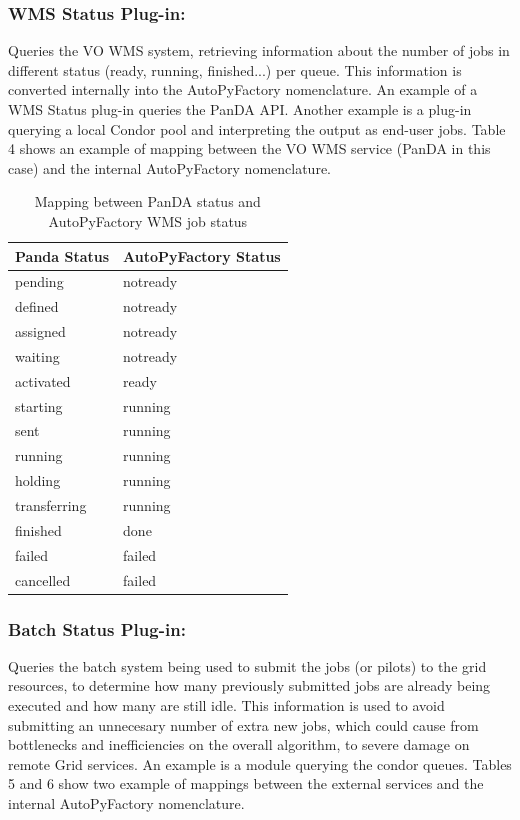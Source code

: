 \documentclass[a4paper]{jpconf}
\begin{document}
\subsubsection{WMS Status Plug-in:}
Queries the VO WMS system, 
retrieving information about the number of jobs in different status (ready, running, finished...) per queue.
This information is converted internally into the AutoPyFactory nomenclature.
An example of a WMS Status plug-in queries the PanDA API.
Another example is a plug-in querying a local Condor pool and interpreting the output as end-user jobs.
Table 4 shows an example of mapping between the VO WMS service 
(PanDA in this case)
and the internal AutoPyFactory nomenclature.

\begin{table}
   \begin{center}
      \begin{tabular}{l l}
         \hline
         \textbf{Panda Status} & \textbf{AutoPyFactory Status}       \\
         \hline
         pending       & notready  \\ 
         defined       & notready  \\ 
         assigned      & notready  \\ 
         waiting       & notready  \\ 
         activated     & ready     \\ 
         starting      & running   \\ 
         sent          & running   \\ 
         running       & running   \\ 
         holding       & running   \\ 
         transferring  & running   \\ 
         finished      & done      \\ 
         failed        & failed    \\ 
         cancelled     & failed    \\ 
         \hline
      \end{tabular}
   \end{center}
   \caption{Mapping between PanDA status and AutoPyFactory WMS job status}
   \label{translation}
\end{table}


\subsubsection{Batch Status Plug-in:}
Queries the batch system being used to submit the jobs (or pilots) to the grid resources,
to determine how many previously submitted jobs are already being executed and how many are still idle.
This information is used to avoid submitting an unnecesary number of extra new jobs, 
which could cause from bottlenecks and inefficiencies on the overall algorithm, to severe damage on remote Grid services.
An example is a module querying the condor queues.
Tables 5 and 6 show two example of mappings between the external services
and the internal AutoPyFactory nomenclature.
\end{document}
